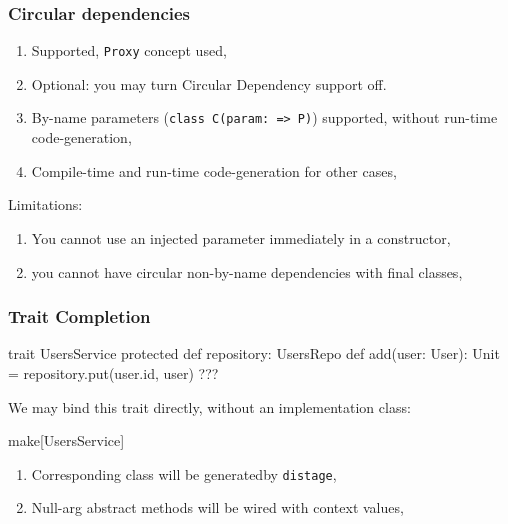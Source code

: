 \documentclass[usenames,dvipsnames]{beamer}
\newcommand{\distage}{\texttt{distage}\xspace}
\begin{document}
\begin{frame}
  \frametitle{Circular dependencies}
  \begin{enumerate}
    \item Supported, \texttt{Proxy} concept used,
    \item Optional: you may turn Circular Dependency support off.
    \item By-name parameters (\texttt{class C(param: => P)}) supported, without run-time code-generation,
    \item Compile-time and run-time code-generation for other cases,
  \end{enumerate}

  Limitations:
  \begin{enumerate}
    \item You cannot use an injected parameter immediately in a constructor,
    \item you cannot have circular non-by-name dependencies with final classes,
  \end{enumerate}
\end{frame}

\begin{frame}[fragile]
\frametitle{Trait Completion}
\begin{scalacode}
trait UsersService {
  protected def repository: UsersRepo
  def add(user: User): Unit = {
    repository.put(user.id, user)
    ???
  }
}
\end{scalacode}
We may bind this trait directly, without an implementation class:

\begin{scalacode}
make[UsersService]
\end{scalacode}

\begin{enumerate}
\item Corresponding class will be generated\footnotemark[1] by \distage,
\item Null-arg abstract methods will be wired with context values,
\end{enumerate}

\end{frame}
\end{document}
